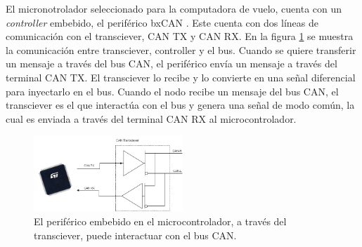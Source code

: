 

El micronotrolador seleccionado para la computadora de vuelo, cuenta con un \textit{controller} embebido, el periférico bxCAN \cite{STM32F746ZG}. Este cuenta con dos líneas de comunicación con el transciever, CAN TX y CAN RX. En la figura \ref{fig:microcontrolador_transciever} se muestra la comunicación entre transciever, controller y el bus. Cuando se quiere transferir un mensaje a través del bus CAN, el periférico envía un mensaje a través del terminal CAN TX. El transciever lo recibe y lo convierte en una señal diferencial para inyectarlo en el bus. Cuando el nodo recibe un mensaje del bus CAN, el transciever es el que interactúa con el bus y genera una señal de modo común, la cual es enviada a través del terminal CAN RX al microcontrolador.

\begin{figure}[H]
    \centering
    \includegraphics[width=0.5\textwidth]{img/microcontrolador_transciever.png}    
    \caption{El periférico embebido en el microcontrolador, a través del transciever, puede interactuar con el bus CAN.}
    \label{fig:microcontrolador_transciever}
\end{figure}

